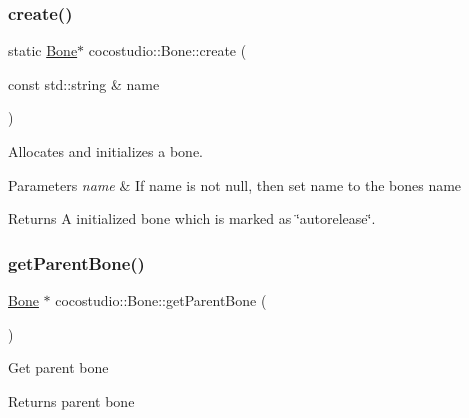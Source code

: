 \subsubsection{\texorpdfstring{create()}{create()}\hspace{0.1cm}{\footnotesize\ttfamily [4/4]}}
{\footnotesize\ttfamily static \hyperlink{classcocostudio_1_1Bone}{Bone}$\ast$ cocostudio\+::\+Bone\+::create (\begin{DoxyParamCaption}\item[{const std\+::string \&}]{name }\end{DoxyParamCaption})\hspace{0.3cm}{\ttfamily [static]}}

Allocates and initializes a bone.


\begin{DoxyParams}{Parameters}
{\em name} & If name is not null, then set name to the bone\textquotesingle{}s name \\
\hline
\end{DoxyParams}
\begin{DoxyReturn}{Returns}
A initialized bone which is marked as \char`\"{}autorelease\char`\"{}. 
\end{DoxyReturn}
\mbox{\label{classcocostudio_1_1Bone_a75f3f3020b33a7d1b105752c3d29dff2}} 
\subsubsection{\texorpdfstring{get\+Parent\+Bone()}{getParentBone()}\hspace{0.1cm}{\footnotesize\ttfamily [1/2]}}
{\footnotesize\ttfamily \hyperlink{classcocostudio_1_1Bone}{Bone} $\ast$ cocostudio\+::\+Bone\+::get\+Parent\+Bone (\begin{DoxyParamCaption}{ }\end{DoxyParamCaption})}

Get parent bone \begin{DoxyReturn}{Returns}
parent bone 
\end{DoxyReturn}
\mbox{\label{classcocostudio_1_1Bone_a8ba5d1a05a287b334b6fbc03e3b82588}} 
